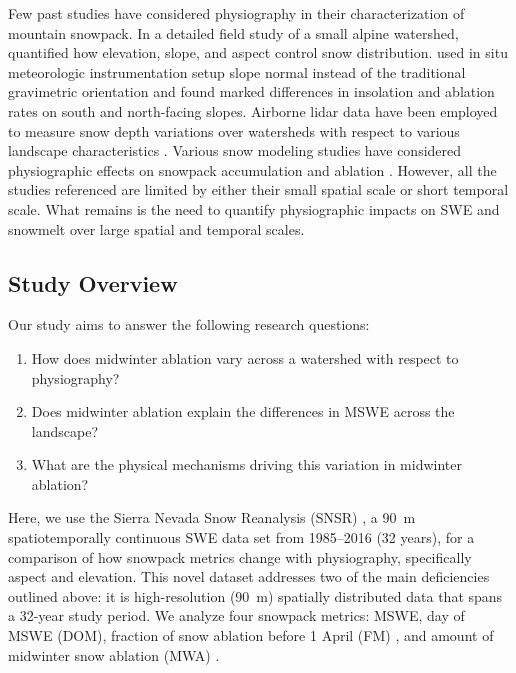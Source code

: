 Few past studies have considered physiography in their characterization of mountain snowpack. In a detailed field study of a small alpine watershed, \cite{elderSnowAccumulationDistribution1991} quantified how elevation, slope, and aspect control snow distribution. \cite{pomeroyVariationSurfaceEnergetics2003} used in situ meteorologic instrumentation setup slope normal instead of the traditional gravimetric orientation and found marked differences in insolation and ablation rates on south and north-facing slopes. Airborne lidar data have been employed to measure snow depth variations over watersheds with respect to various landscape characteristics \citep{kirchnerLiDARMeasurementSeasonal2014, tennantRegionalSensitivitiesSeasonal2017}. Various snow modeling studies have considered physiographic effects on snowpack accumulation and ablation \citep{broxtonForestCoverTopography2020,mazzottiCanopyStructureTopography2023, lopez-morenoEffectSlopeAspect2014}. However, all the studies referenced are limited by either their small spatial scale or short temporal scale. What remains is the need to quantify physiographic impacts on SWE and snowmelt over large spatial and temporal scales. 

\subsection{Study Overview}
Our study aims to answer the following research questions:

\begin{enumerate}
    \item How does midwinter ablation vary across a watershed with respect to physiography?

    \item Does midwinter ablation explain the differences in MSWE across the landscape?
    
    \item What are the physical mechanisms driving this variation in midwinter ablation?
\end{enumerate}
 
Here, we use the Sierra Nevada Snow Reanalysis (SNSR) \citep{margulisLandsatEraSierraNevada2016}, a 90~m spatiotemporally continuous SWE data set from 1985--2016 (32 years), for a comparison of how snowpack metrics change with physiography, specifically aspect and elevation. This novel dataset addresses two of the main deficiencies outlined above: it is high-resolution (90~m) spatially distributed data that spans a 32-year study period. We analyze four snowpack metrics: MSWE, day of MSWE (DOM), fraction of snow ablation before 1 April (FM) \citep{musselmanWinterMeltTrends2021}, and amount of midwinter snow ablation (MWA) \citep{harpoldHumidityDeterminesSnowpack2018}. 

